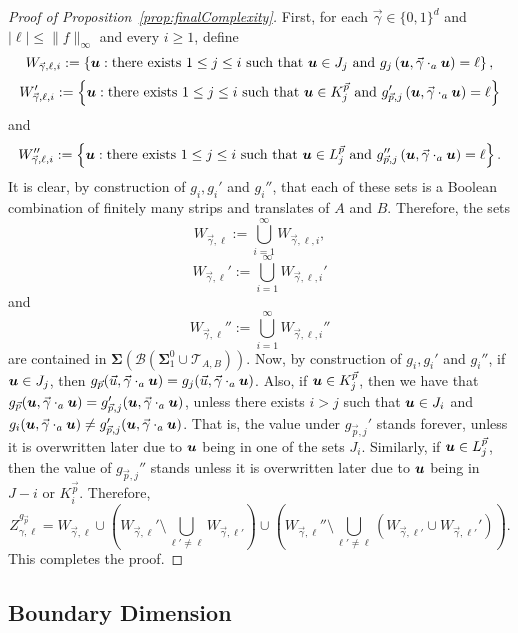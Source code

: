 \documentclass[12pt,a4paper]{amsart}
\numberwithin{equation}{section}
\newcommand{\bSigma}{\boldsymbol{\Sigma}}
\newcommand{\bB}{\boldsymbol{\mathcal{B}}}
\theoremstyle{definition}
\begin{document}
\begin{proof}[Proof of Proposition~\ref{prop:finalComplexity}]
First, for each $\vec{\gamma}\in\{0,1\}^d$ and $|\ell|\leq \|f\|_\infty$ and every $i\geq1$, define
\[W_{\vec{\gamma},\ell,i}:=\left\{\boldsymbol{u}: \text{there exists }1\leq j\leq i\text{ such that }\boldsymbol{u}\in J_j\text{ and }g_j\left(\boldsymbol{u},\vec{\gamma}\cdot_a\boldsymbol{u}\right)=\ell \right\},\]
\[W_{\vec{\gamma},\ell,i}':=\left\{\boldsymbol{u}: \text{there exists }1\leq j\leq i\text{ such that }\boldsymbol{u}\in K_j^{\vec{p}}\text{ and }g_{\vec{p},j}'\left(\boldsymbol{u},\vec{\gamma}\cdot_a\boldsymbol{u}\right)=\ell \right\}\]
and
\[W_{\vec{\gamma},\ell,i}'':=\left\{\boldsymbol{u}: \text{there exists }1\leq j\leq i\text{ such that }\boldsymbol{u}\in L_j^{\vec{p}}\text{ and }g_{\vec{p},j}''\left(\boldsymbol{u},\vec{\gamma}\cdot_a\boldsymbol{u}\right)=\ell \right\}.\]
It is clear, by construction of $g_i,g_i'$ and $g_i''$, that each of these sets is a Boolean combination of finitely many strips and translates of $A$ and $B$. Therefore, the sets
\[W_{\vec{\gamma},\ell}:=\bigcup_{i=1}^\infty W_{\vec{\gamma},\ell,i},\]
\[W_{\vec{\gamma},\ell}':=\bigcup_{i=1}^\infty W_{\vec{\gamma},\ell,i}'\]
and
\[W_{\vec{\gamma},\ell}'':=\bigcup_{i=1}^\infty W_{\vec{\gamma},\ell,i}''\]
are contained in $\bSigma\left(\bB\left(\bSigma_1^0\cup \mathcal{T}_{A,B}\right)\right)$. Now, by construction of $g_i,g_i'$ and $g_i''$, if $\boldsymbol{u}\in J_j$, then $g_{\vec{p}}(\vec{u},\vec{\gamma}\cdot_a\boldsymbol{u})=g_j(\vec{u},\vec{\gamma}\cdot_a\boldsymbol{u})$. Also, if $\boldsymbol{u}\in K_j^{\vec{p}}$, then we have that $g_{\vec{p}}(\boldsymbol{u},\vec{\gamma}\cdot_a\boldsymbol{u})=g_{\vec{p},j}'(\boldsymbol{u},\vec{\gamma}\cdot_a\boldsymbol{u})$, unless there exists $i>j$ such that $\boldsymbol{u}\in J_i$ and $g_i(\boldsymbol{u},\vec{\gamma}\cdot_a\boldsymbol{u})\neq  g_{\vec{p},j}'(\boldsymbol{u},\vec{\gamma}\cdot_a\boldsymbol{u})$. That is, the value under $g_{\vec{p},j}'$ stands forever, unless it is overwritten later due to $\boldsymbol{u}$ being in one of the sets $J_i$. Similarly, if $\boldsymbol{u}\in L_j^{\vec{p}}$, then the value of $g_{\vec{p},j}''$  stands unless it is overwritten later due to $\boldsymbol{u}$ being in $J-i$ or $K_i^{\vec{p}}$. Therefore,
\[Z_{\gamma,\ell}^{g_{\vec{p}}} = W_{\vec{\gamma},\ell}\cup \left(W_{\vec{\gamma},\ell}' \setminus \bigcup_{\ell'\neq \ell}W_{\vec{\gamma},\ell'}\right)\cup \left(W_{\vec{\gamma},\ell}'' \setminus \bigcup_{\ell'\neq \ell}\left(W_{\vec{\gamma},\ell'}\cup W_{\vec{\gamma},\ell'}'\right)\right).\]
This completes the proof.
\end{proof}


\subsection{Boundary Dimension}
\end{document}
